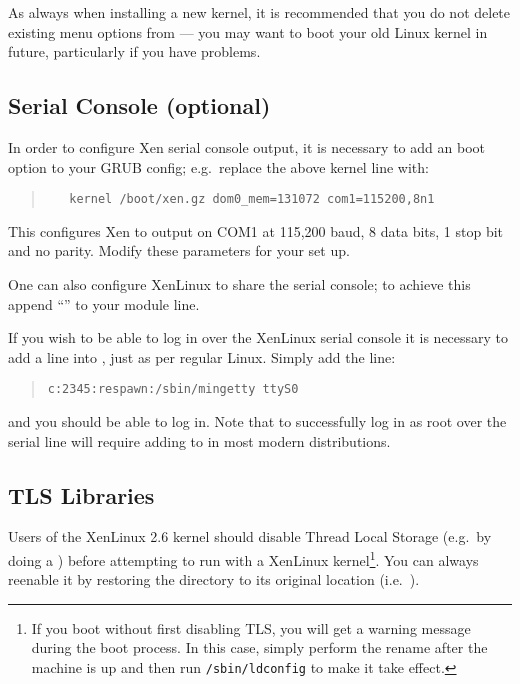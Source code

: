 As always when installing a new kernel, it is recommended that you do
not delete existing menu options from  --- you may want
to boot your old Linux kernel in future, particularly if you have
problems.

\subsection{Serial Console (optional)}



In order to configure Xen serial console output, it is necessary to
add an boot option to your GRUB config; e.g.\ replace the above kernel
line with:
\begin{quote}
{\small
\begin{verbatim}
   kernel /boot/xen.gz dom0_mem=131072 com1=115200,8n1
\end{verbatim}}
\end{quote}

This configures Xen to output on COM1 at 115,200 baud, 8 data bits, 1
stop bit and no parity. Modify these parameters for your set up.

One can also configure XenLinux to share the serial console; to
achieve this append ``'' to your module line.

If you wish to be able to log in over the XenLinux serial console it
is necessary to add a line into , just as per
regular Linux. Simply add the line:
\begin{quote} {\small {\tt c:2345:respawn:/sbin/mingetty ttyS0}}
\end{quote}

and you should be able to log in. Note that to successfully log in as
root over the serial line will require adding  to
 in most modern distributions.

\subsection{TLS Libraries}

Users of the XenLinux 2.6 kernel should disable Thread Local Storage
(e.g.\ by doing a ) before
attempting to run with a XenLinux kernel\footnote{If you boot without
  first disabling TLS, you will get a warning message during the boot
  process. In this case, simply perform the rename after the machine
  is up and then run \texttt{/sbin/ldconfig} to make it take effect.}.
You can always reenable it by restoring the directory to its original
location (i.e.\ ).

